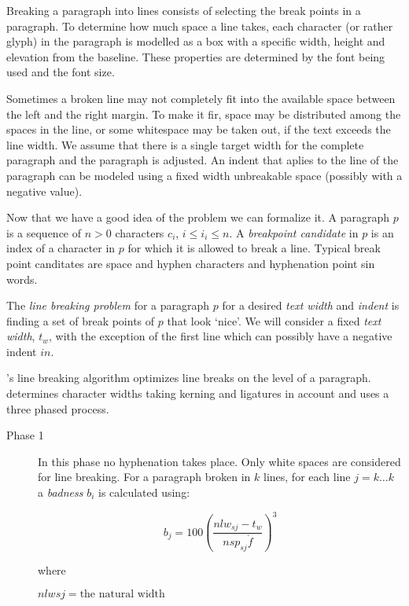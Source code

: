 {{Breaking a paragraph into lines consists of selecting the break points in a paragraph. To determine how much space a line takes, each character (or rather glyph) in the paragraph is modelled as a box with a specific width, height and elevation from the baseline. These properties are determined by the font being used and the font size.

\scalebox{2}{efficient}

\scalebox{2}{efficient}

Sometimes a broken line may not completely fit into the available space between the left and the right margin. To make it fir, space may be distributed among the spaces in the line, or some whitespace may be taken out, if the text exceeds the 
line width. We assume that there is a single target width for the complete paragraph and the paragraph is adjusted. 
An indent that aplies to the line of the paragraph can be modeled using a fixed width unbreakable space (possibly with a negative value).

Now that we have a good idea of the problem we can formalize it. A paragraph $p$ is a sequence of $n>0$ characters $c_i$,  $i\leq i_i \leq n$.
A \textit{breakpoint candidate} in $p$ is an index of a character in $p$ for which it is allowed to break a line. Typical break point canditates are space and hyphen characters and hyphenation point sin words.

The \textit{line breaking problem} for a paragraph $p$ for a desired \textit{text width} and \textit{indent} is finding a set of break points of $p$ that look `nice'. We will consider a fixed \textit{text width}, $t_w$, with the exception of the first line which can possibly have a negative indent $in$.

\tex's line breaking algorithm optimizes line breaks on the level of a paragraph. \tex determines character widths taking kerning and ligatures in account and uses a three phased process. 

\begin{description}
\item[Phase 1] In this phase no hyphenation takes place. Only white spaces are considered  for line breaking. For a paragraph broken in $k$ lines, for each line $j=k\ldots k$  a \textit{badness} $b_i$ is calculated using:

$$b_j=100\left(\frac{nlw_{sj}-t_w}{nsp_{sj}\dot f}\right)^{3}$$

where 

$nlw{sj} = \text{the natural width}$



\end{description}}}
